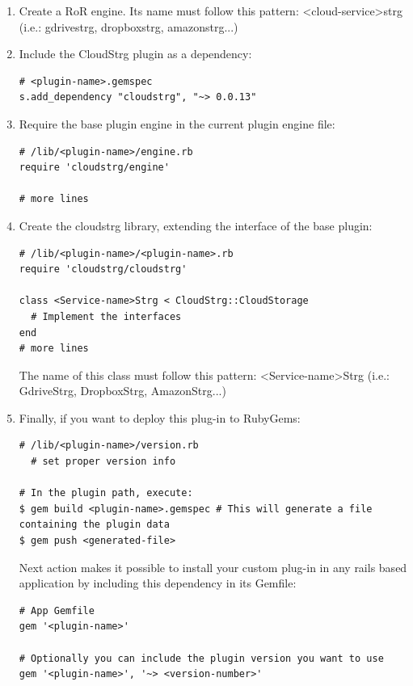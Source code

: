\documentclass{article}
\begin{document}
\begin{enumerate}
\item Create a RoR engine. Its name must follow this pattern: \textless cloud-service\textgreater strg (i.e.: gdrivestrg, dropboxstrg, amazonstrg...)

\item Include the CloudStrg plugin as a dependency:
\begin{verbatim}
# <plugin-name>.gemspec
s.add_dependency "cloudstrg", "~> 0.0.13"
\end{verbatim}

\item Require the base plugin engine in the current plugin engine file:
\begin{verbatim}
# /lib/<plugin-name>/engine.rb
require 'cloudstrg/engine'

# more lines
\end{verbatim}

\item Create the cloudstrg library, extending the interface of the base plugin:
\begin{verbatim}
# /lib/<plugin-name>/<plugin-name>.rb
require 'cloudstrg/cloudstrg'

class <Service-name>Strg < CloudStrg::CloudStorage
  # Implement the interfaces
end
# more lines
\end{verbatim}

The name of this class must follow this pattern: \textless Service-name\textgreater Strg (i.e.: GdriveStrg, DropboxStrg, AmazonStrg...)

\item Finally, if you want to deploy this plug-in to RubyGems:
\begin{verbatim}
# /lib/<plugin-name>/version.rb
  # set proper version info

# In the plugin path, execute:
$ gem build <plugin-name>.gemspec # This will generate a file containing the plugin data 
$ gem push <generated-file>
\end{verbatim}

Next action makes it possible to install your custom plug-in in any rails based application by including this dependency in its Gemfile:
\begin{verbatim}
# App Gemfile
gem '<plugin-name>'

# Optionally you can include the plugin version you want to use
gem '<plugin-name>', '~> <version-number>'
\end{verbatim}

\end{enumerate}
\end{document}

